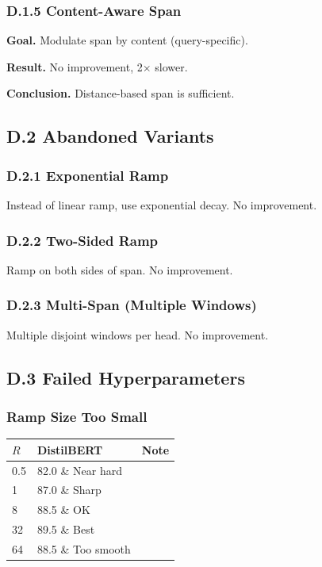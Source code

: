 \subsubsection{D.1.5 Content-Aware Span}

\textbf{Goal.} Modulate span by content (query-specific).

\textbf{Result.} No improvement, 2$\times$ slower.

\textbf{Conclusion.} Distance-based span is sufficient.

\subsection{D.2 Abandoned Variants}

\subsubsection{D.2.1 Exponential Ramp}

Instead of linear ramp, use exponential decay. No improvement.

\subsubsection{D.2.2 Two-Sided Ramp}

Ramp on both sides of span. No improvement.

\subsubsection{D.2.3 Multi-Span (Multiple Windows)}

Multiple disjoint windows per head. No improvement.

\subsection{D.3 Failed Hyperparameters}

\subsubsection{Ramp Size Too Small}
\begin{table}[H]
\centering
\small
\begin{tabular}{lll}
\toprule
\textbf{$R$} & \textbf{DistilBERT} & \textbf{Note} \\
\midrule
0.5 & 82.0 \& Near hard \\
1 & 87.0 \& Sharp \\
8 & 88.5 \& OK \\
32 & 89.5 \& Best \\
64 & 88.5 \& Too smooth \\
\bottomrule
\end{tabular}
\end{table}

